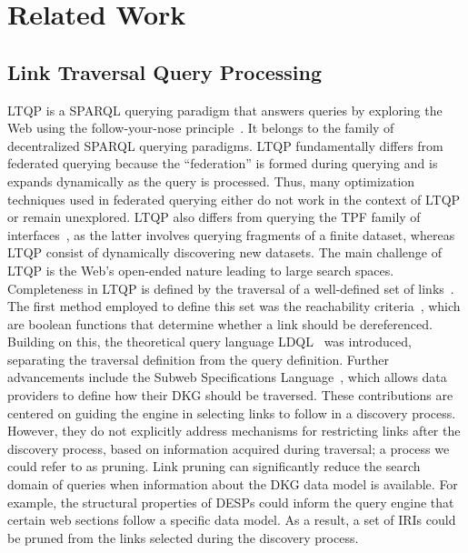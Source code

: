\section{Related Work}\label{sec:related_work}

\subsection{Link Traversal Query Processing}
LTQP is a SPARQL querying paradigm that answers queries by exploring the Web using the follow-your-nose principle~\cite{hartig2016walking}.
It belongs to the family of decentralized SPARQL querying paradigms.
LTQP fundamentally differs from federated querying because the ``federation'' is formed during querying and is expands dynamically as the query is processed.
Thus, many optimization techniques used in federated querying either do not work in the context of LTQP or remain unexplored.
LTQP also differs from querying the TPF family of interfaces~\cite{azzam2020smart,azzam2021wisekg, DBLP:journals/corr/HartigA16}, as the latter involves querying fragments of a finite dataset, whereas LTQP consist of dynamically discovering new datasets.
The main challenge of LTQP is the Web's open-ended nature leading to large search spaces.
Completeness in LTQP is defined by the traversal of a well-defined set of links~\cite{Hartig2012}.
The first method employed to define this set was the reachability criteria~\cite{Hartig2012}, which are boolean functions that determine whether a link should be dereferenced.
Building on this, the theoretical query language LDQL~\cite{hartigLDQL} was introduced, separating the traversal definition from the query definition.
Further advancements include the Subweb Specifications Language~\cite{Bogaerts2021LinkTW}, which allows data providers to define how their DKG should be traversed.
These contributions are centered on guiding the engine in selecting links to follow in a discovery process.
However, they do not explicitly address mechanisms for restricting links after the discovery process, based on information acquired during traversal; a process we could refer to as pruning.
Link pruning can significantly reduce the search domain of queries when information about the DKG data model is available.
For example, the structural properties of DESPs could inform the query engine that certain web sections follow a specific data model. 
As a result, a set of IRIs could be pruned from the links selected during the discovery process.


